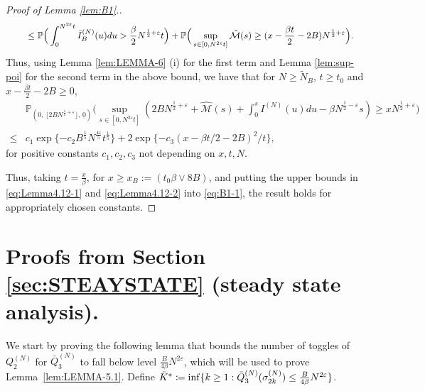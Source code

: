\documentclass[11pt, reqno]{article}
\numberwithin{equation}{section}
\numberwithin{theorem}{section}
\newcommand\blue[1]{#1}
\begin{document}
\begin{appendix}
\begin{proof}[Proof of Lemma \ref{lem:B1}.]
\begin{align*}
    &\qquad\leq \mathbb{P}\Big(\int_0^{N^{2\varepsilon}t}\Bar{I}_B^{(N)}(u)du>\frac{\beta}{2}N^{\frac{1}{2}+\varepsilon}t\Big) + \mathbb{P}\Big(\sup_{s\in[0,N^{2\varepsilon}t]}\hat{\mathcal{M}}(s)\geq (x-\frac{\beta t}{2}-2B)N^{\frac{1}{2}+\varepsilon}\Big).
\end{align*}
Thus, using Lemma \ref{lem:LEMMA-6} (i) for the first term and Lemma \ref{lem:sup-poi} for the second term in the above bound,
we have that  for $N\geq \tilde N_B$, $t\geq t_0$ and $x-\frac{\beta t}{2}-2B\geq0$,
\begin{align}\label{eq:Lemma4.12-2}
    &\mathbb{P}_{(0, \, \lfloor 2BN^{\frac{1}{2}+\varepsilon} \rfloor, \,\underline{0})}\Big(\sup_{s\in[0,N^{2\varepsilon}t]}\left(2BN^{\frac{1}{2}+\varepsilon}+\hat{\mathcal{M}}(s)+\int_{0}^{s}I^{(N)}(u)du-\beta N^{\frac{1}{2}-\varepsilon}s\right) \geq xN^{\frac{1}{2}+\varepsilon}\Big)\nonumber\\
    \leq &c_1\exp \{-c_2 B^{\frac{1}{5}}N^{\frac{4\varepsilon}{5}}t^{\frac{1}{5}}\}+ 2\exp \{-c_3(x- \beta t/2-2B)^2/t\},
\end{align}
for positive constants $c_1,c_2,c_3$ not depending on $x,t,N$.

Thus, taking $t=\frac{x}{\beta}$, for $x\geq x_B :=(t_0\beta \vee8B)$, and putting the upper bounds in \eqref{eq:Lemma4.12-1} and \eqref{eq:Lemma4.12-2} into \eqref{eq:B1-1}, the result holds for appropriately chosen constants.
\end{proof}


\section{Proofs from Section \ref{sec:STEAYSTATE} (steady state analysis).}\label{app:steady}
We start by proving the following lemma that \blue{bounds the number of toggles of $Q^{(N)}_2$ for $\bar{Q}^{(N)}_3$ to fall below level $\frac{B}{4\beta}N^{2\varepsilon}$, which will be used to prove Lemma~\ref{lem:LEMMA-5.1}}. Define $\bar{K}^{*}\coloneqq \inf \{k\geq 1: \Bar{Q}^{(N)}_3(\sigma^{(N)}_{2k})\leq \frac{B}{4\beta}N^{2\varepsilon}\}$.


\end{appendix}
\end{document}
